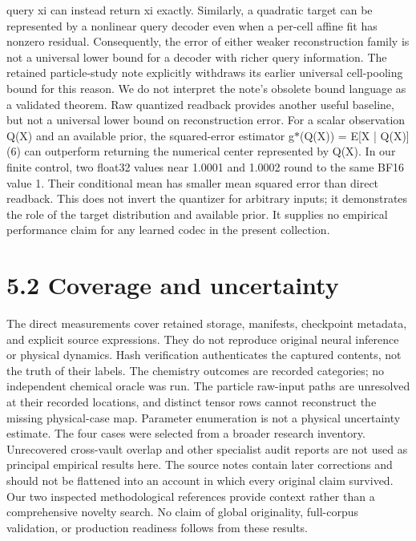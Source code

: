 \documentclass[11pt]{article}
\begin{document}
query xi can instead return xi exactly. Similarly, a quadratic target can be represented by a
nonlinear query decoder even when a per-cell affine fit has nonzero residual. Consequently, the
error of either weaker reconstruction family is not a universal lower bound for a decoder with
richer query information. The retained particle-study note explicitly withdraws its earlier universal
cell-pooling bound for this reason. We do not interpret the note’s obsolete bound language as a
validated theorem.
Raw quantized readback provides another useful baseline, but not a universal lower bound on
reconstruction error. For a scalar observation Q(X) and an available prior, the squared-error
estimator
g\ensuremath{\ast}(Q(X)) = E[X | Q(X)] (6)
can outperform returning the numerical center represented by Q(X). In our finite control, two
float32 values near 1.0001 and 1.0002 round to the same BF16 value 1. Their conditional mean
has smaller mean squared error than direct readback. This does not invert the quantizer for
arbitrary inputs; it demonstrates the role of the target distribution and available prior. It supplies
no empirical performance claim for any learned codec in the present collection.

\section*{5.2 Coverage and uncertainty}

The direct measurements cover retained storage, manifests, checkpoint metadata, and explicit
source expressions. They do not reproduce original neural inference or physical dynamics. Hash
verification authenticates the captured contents, not the truth of their labels. The chemistry
outcomes are recorded categories; no independent chemical oracle was run. The particle raw-input
paths are unresolved at their recorded locations, and distinct tensor rows cannot reconstruct the
missing physical-case map. Parameter enumeration is not a physical uncertainty estimate.
The four cases were selected from a broader research inventory. Unrecovered cross-vault overlap
and other specialist audit reports are not used as principal empirical results here. The source notes
contain later corrections and should not be flattened into an account in which every original claim
survived. Our two inspected methodological references provide context rather than a comprehensive
novelty search. No claim of global originality, full-corpus validation, or production readiness follows
from these results.
\end{document}
